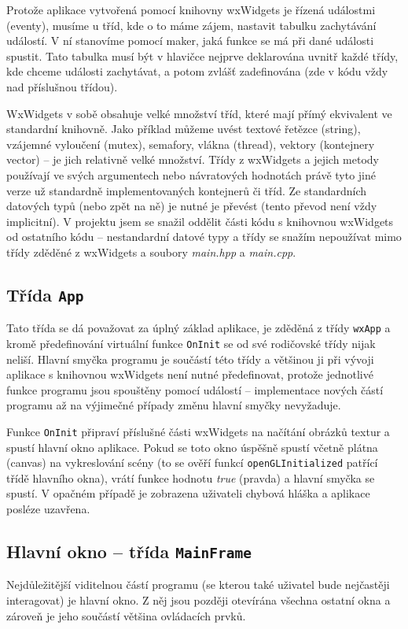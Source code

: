 \documentclass[a4paper, 12pt]{report}
\begin{document}
Protože aplikace vytvořená pomocí knihovny wxWidgets je řízená událostmi (eventy), musíme u tříd, kde o to máme zájem, nastavit tabulku zachytávání událostí. V ní stanovíme pomocí maker, jaká funkce se má při dané události spustit. Tato tabulka musí být v hlavičce nejprve deklarována uvnitř každé třídy, kde chceme události zachytávat, a potom zvlášť zadefinována (zde v kódu vždy nad příslušnou třídou).

WxWidgets v sobě obsahuje velké množství tříd, které mají přímý ekvivalent ve standardní knihovně. Jako příklad můžeme uvést textové řetězce (string), vzájemné vyloučení (mutex), semafory, vlákna (thread), vektory (kontejnery vector) -- je jich relativně velké množství. Třídy z wxWidgets a jejich metody používají ve svých argumentech nebo návratových hodnotách právě tyto jiné verze už standardně implementovaných kontejnerů či tříd. Ze standardních datových typů (nebo zpět na ně) je nutné je převést (tento převod není vždy implicitní). V projektu jsem se snažil oddělit části kódu s knihovnou wxWidgets od ostatního kódu -- nestandardní datové typy a třídy se snažím nepoužívat mimo třídy zděděné z wxWidgets a soubory \emph{main.hpp} a \emph{main.cpp}.

\subsection{Třída \texttt{App}}
Tato třída se dá považovat za úplný základ aplikace, je zděděná z třídy \texttt{wxApp} a kromě předefinování virtuální funkce \texttt{OnInit} se od své rodičovské třídy nijak neliší. Hlavní smyčka programu je součástí této třídy a většinou ji při vývoji aplikace s knihovnou wxWidgets není nutné předefinovat, protože jednotlivé funkce programu jsou spouštěny pomocí událostí -- implementace nových částí programu až na výjimečné případy změnu hlavní smyčky nevyžaduje.

Funkce \texttt{OnInit} připraví příslušné části wxWidgets na načítání obrázků textur a spustí hlavní okno aplikace. Pokud se toto okno úspěšně spustí včetně plátna (canvas) na vykreslování scény (to se ověří funkcí \texttt{openGLInitialized} patřící třídě hlavního okna), vrátí funkce hodnotu \emph{true} (pravda) a hlavní smyčka se spustí. V opačném případě je zobrazena uživateli chybová hláška a aplikace posléze uzavřena.

\subsection{Hlavní okno -- třída \texttt{MainFrame}}
Nejdůležitější viditelnou částí programu (se kterou také uživatel bude nejčastěji interagovat) je hlavní okno. Z něj jsou později otevírána všechna ostatní okna a zároveň je jeho součástí většina ovládacích prvků.
\end{document}
